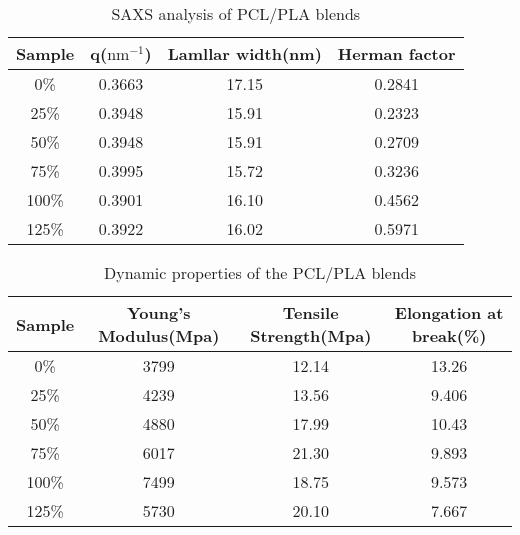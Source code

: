 \documentclass{Head}
\begin{document}
\begin{table}
    \caption{SAXS analysis of PCL/PLA blends}
    \begin{tabular}{cccc}
        \toprule
        Sample & \textbf{q}($\mathrm{nm^{-1}}$) & Lamllar width(nm) & Herman factor \\
        \midrule
        0\%    & 0.3663                         & 17.15             & 0.2841        \\
        25\%   & 0.3948                         & 15.91             & 0.2323        \\
        50\%   & 0.3948                         & 15.91             & 0.2709        \\
        75\%   & 0.3995                         & 15.72             & 0.3236        \\
        100\%  & 0.3901                         & 16.10             & 0.4562        \\
        125\%  & 0.3922                         & 16.02             & 0.5971        \\
        \bottomrule
    \end{tabular}
\end{table}
\begin{table}
    \caption{Dynamic properties of the PCL/PLA blends}
    \begin{tabular}{cccc}
        \toprule
        Sample & Young's Modulus(Mpa) & Tensile Strength(Mpa) & Elongation at break(\%) \\
        \midrule
        0\%    & 3799                 & 12.14                 & 13.26                   \\
        25\%   & 4239                 & 13.56                 & 9.406                   \\
        50\%   & 4880                 & 17.99                 & 10.43                   \\
        75\%   & 6017                 & 21.30                 & 9.893                   \\
        100\%  & 7499                 & 18.75                 & 9.573                   \\
        125\%  & 5730                 & 20.10                 & 7.667                   \\
        \bottomrule
    \end{tabular}
\end{table}
\end{document}
